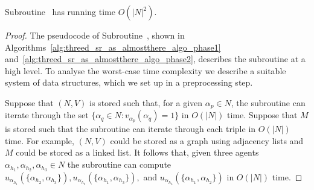 \begin{lem}
\label{lem:threed_sr_as_symmetric_binary_almosttherealgo_runningtime}
Subroutine~ has running time $O(|N|^2)$.
\end{lem}
\begin{proof}
The pseudocode of Subroutine~, shown in Algorithms~\ref{alg:threed_sr_as_almostthere_algo_phase1} and~\ref{alg:threed_sr_as_almostthere_algo_phase2}, describes the subroutine at a high level. To analyse the worst-case time complexity we describe a suitable system of data structures, which we set up in a preprocessing step.%

Suppose that $(N, V)$ is stored such that, for a given $\alpha_{p}\in N$, the subroutine can iterate through the set $\{ \alpha_{q} \in N : v_{\alpha_{p}}(\alpha_{q})=1 \}$ in $O(|N|)$ time. Suppose that $M$ is stored such that the subroutine can iterate through each triple in $O(|N|)$ time. For example, $(N, V)$ could be stored as a graph using adjacency lists and $M$ could be stored as a linked list. It follows that, given three agents $\alpha_{h_1}, \alpha_{h_2}, \alpha_{h_3}\in N$ the subroutine can compute $u_{\alpha_{h_1}}(\{ \alpha_{h_2}, \alpha_{h_3} \}), u_{\alpha_{h_2}}(\{ \alpha_{h_1}, \alpha_{h_3} \}),$ and $u_{\alpha_{h_3}}(\{ \alpha_{h_1}, \alpha_{h_2} \})$ in $O(|N|)$ time.


\end{proof}
